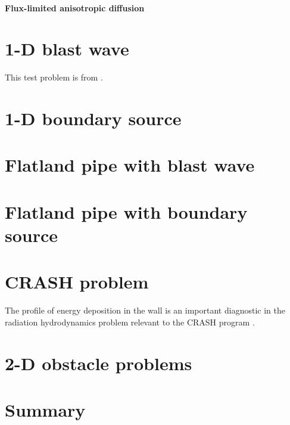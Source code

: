 \paragraph{Flux-limited anisotropic diffusion}

\section{1-D blast wave}
This test problem is from \cite{Rau2005,Ols2007}.

\section{1-D boundary source}

\section{Flatland pipe with blast wave}

\section{Flatland pipe with boundary source}

\section{CRASH problem}
The profile of energy deposition in the wall is an important diagnostic in the
radiation hydrodynamics problem relevant to the CRASH program \cite{HolCom2011}.

\section{2-D obstacle problems}
\cite{Mou2006}

\section{Summary}


